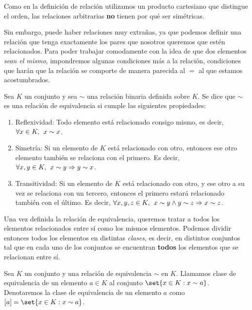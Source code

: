 \documentclass[../algebra_lineal.tex]{subfiles}
\begin{document}
\begin{remark}
    Como en la definición de relación utilizamos un producto cartesiano que distingue el orden, las relaciones arbitrarias \textbf{no} tienen por qué ser simétricas. 
\end{remark}

Sin embargo, puede haber relaciones muy extrañas, ya que podemos definir una relación que tenga exactamente los pares que nosotros queremos que estén relacionados. Para poder trabajar comodamente con la idea de que dos elementos \textit{sean el mismo}, impondremos algunas condiciones más a la relación, condiciones que harán que la relación se comporte de manera parecida al $=$ al que estamos acostumbrados.

\begin{definition}
    Sea $K$ un conjunto y sea $\sim$ una relación binaria definida sobre $K$. Se dice que $\sim$ es una relación de equivalencia si cumple las siguientes propiedades:
    \begin{enumerate}
        \item Reflexividad: Todo elemento está relacionado consigo mismo, es decir, $\forall x \in K, \hspace{1.5mm} x \sim x$.
        \item Simetría: Si un elemento de $K$ está relacionado con otro, entonces ese otro elemento también se relaciona con el primero. Es decir, $\forall x, y \in K, \hspace{1.5mm} x \sim y \Rightarrow y \sim x$.
        \item Transitividad: Si un elemento de $K$ está relacionado con otro, y ese otro a su vez se relaciona con un tercero, entonces el primero estará relacionado también con el último. Es decir, $\forall x, y, z \in K, \hspace{1.5mm} x \sim y \land y \sim z \Rightarrow x \sim z$.
    \end{enumerate}
\end{definition}

Una vez definida la relación de equivalencia, queremos tratar a todos los elementos relacionados entre sí como los mismos elementos. Podemos dividir entonces todos los elementos en distintas \textit{clases}, es decir, en distintos conjuntos tal que en cada uno de los conjuntos se encuentran \textbf{todos} los elementos que se relacionan entre sí.

\begin{definition}
    Sea $K$ un conjunto y una relación de equivalencia $\sim$ en $K$. Llamamos clase de equivalencia de un elemento $a \in K$ al conjunto $\set{x \in K : x \sim a}$. Denotaremos la clase de equivalencia de un elemento $a$ como $[a] = \set{x \in K : x \sim a}$. 
\end{definition}
\end{document}

